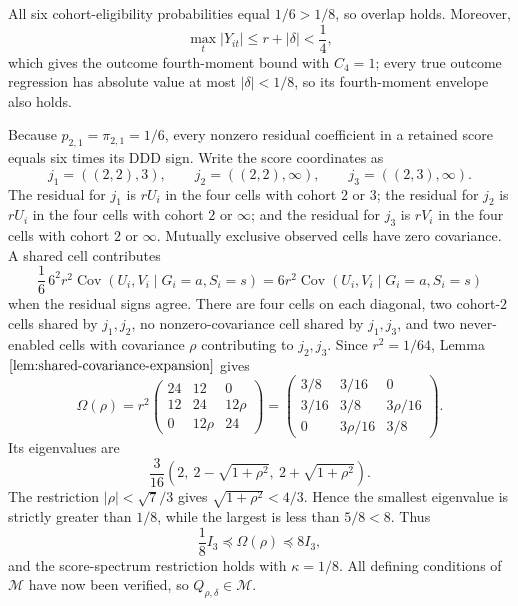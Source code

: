 All six cohort-eligibility probabilities equal \(1/6>1/8\), so overlap holds. Moreover,
\[
\max_t|Y_{it}|\le r+|\delta|<\frac14,
\]
which gives the outcome fourth-moment bound with \(C_4=1\); every true outcome regression has absolute value at most \(|\delta|<1/8\), so its fourth-moment envelope also holds.

Because \(p_{2,1}=\pi_{2,1}=1/6\), every nonzero residual coefficient in a retained score equals six times its DDD sign. Write the score coordinates as
\[
j_1=((2,2),3),\qquad
j_2=((2,2),\infty),\qquad
j_3=((2,3),\infty).
\]
The residual for \(j_1\) is \(rU_i\) in the four cells with cohort \(2\) or \(3\); the residual for \(j_2\) is \(rU_i\) in the four cells with cohort \(2\) or \(\infty\); and the residual for \(j_3\) is \(rV_i\) in the four cells with cohort \(2\) or \(\infty\). Mutually exclusive observed cells have zero covariance. A shared cell contributes
\[
\frac16\,6^2r^2\operatorname{Cov}(U_i,V_i\mid G_i=a,S_i=s)
=6r^2\operatorname{Cov}(U_i,V_i\mid G_i=a,S_i=s)
\]
when the residual signs agree. There are four cells on each diagonal, two cohort-\(2\) cells shared by \(j_1,j_2\), no nonzero-covariance cell shared by \(j_1,j_3\), and two never-enabled cells with covariance \(\rho\) contributing to \(j_2,j_3\). Since \(r^2=1/64\), Lemma \(\ref{lem:shared-covariance-expansion}\) gives
\[
\Omega(\rho)=r^2
\begin{pmatrix}
24&12&0\\
12&24&12\rho\\
0&12\rho&24
\end{pmatrix}
=
\begin{pmatrix}
3/8&3/16&0\\
3/16&3/8&3\rho/16\\
0&3\rho/16&3/8
\end{pmatrix}.
\]
Its eigenvalues are
\[
\frac3{16}\left(2,\ 2-\sqrt{1+\rho^2},\ 2+\sqrt{1+\rho^2}\right).
\]
The restriction \(|\rho|<\sqrt7/3\) gives \(\sqrt{1+\rho^2}<4/3\). Hence the smallest eigenvalue is strictly greater than \(1/8\), while the largest is less than \(5/8<8\). Thus
\[
\frac18 I_3\preceq\Omega(\rho)\preceq8I_3,
\]
and the score-spectrum restriction holds with \(\kappa=1/8\). All defining conditions of \(\mathcal M\) have now been verified, so \(Q_{\rho,\delta}\in\mathcal M\).

